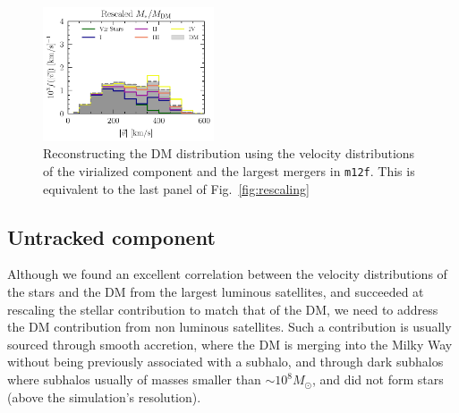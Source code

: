 \documentclass[twocolumn,preprintnumbers]{aastex6}
\DeclareRobustCommand{\Fig}[1]{Fig.~\ref{#1}}
\newcommand{\mf}{\texttt{m12f}}
\begin{document}
\begin{figure}[tb] %
   \centering
	\includegraphics[width=0.45\textwidth]{plots/construct_dm_from_stars_top_mergers_m12f.pdf}
   \caption{Reconstructing the DM distribution using the velocity distributions of the virialized component and the largest mergers in \mf. This is equivalent to the last panel of \Fig{fig:rescaling}}
   \label{fig:constructed_dm}
\end{figure}


\subsection{Untracked component}
\label{sec:untracked}




Although we found an excellent correlation between the velocity distributions of the stars and the DM from the largest luminous satellites, and succeeded at rescaling the stellar contribution to match that of the DM,  we need to address the DM contribution from non luminous satellites. Such a contribution is usually sourced through smooth accretion, where the DM is merging into the Milky Way without being previously associated with a subhalo, and through dark subhalos where subhalos usually of masses smaller than $\sim 10^8 M_\odot$, and did not form stars (above the simulation's resolution).
\end{document}
